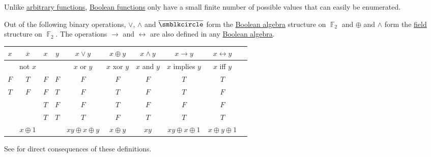 \begin{definition}\label{def:standard_boolean_operators}
  Unlike \hyperref[def:function]{arbitrary functions}, \hyperref[def:boolean_function]{Boolean functions} only have a small finite number of possible values that can easily be enumerated.

  Out of the following binary operations, \( \vee \), \( \wedge \) and \( \overline{\anon} \) form the \hyperref[def:boolean_algebra]{Boolean algebra} structure on \( \BbbF_2 \) and \( \oplus \) and \( \wedge \) form the \hyperref[def:field]{field} structure on \( \BbbF_2 \). The operations \( \rightarrow \) and \( \leftrightarrow \) are also defined in any \hyperref[def:boolean_algebra]{Boolean algebra}.

  \begin{center}
    \begin{tabular}{c | c || c c | c c c c c c}
      \( x \) & \( \overline{x} \) & \( x \) & \( y \) & \( x \vee y \)             & \( x \oplus y \)    & \( x \wedge y \)        & \( x \rightarrow y \)   & \( x \leftrightarrow y \) \\
      \hline
              & not \( x \)        &         &         & \( x \) or \( y \)         & \( x \) xor \( y \) & \( x \) and \( y \)     & \( x \) implies \( y \) & \( x \) iff \( y \)       \\
      \hline
      \( F \) & \( T \)            & \( F \) & \( F \) & \( F \)                    & \( F \)             & \( F \)                 & \( T \)                 & \( T \)                   \\
      \( T \) & \( F \)            & \( F \) & \( T \) & \( F \)                    & \( T \)             & \( F \)                 & \( T \)                 & \( F \)                   \\
              &                    & \( T \) & \( F \) & \( F \)                    & \( T \)             & \( F \)                 & \( F \)                 & \( F \)                   \\
              &                    & \( T \) & \( T \) & \( T \)                    & \( F \)             & \( T \)                 & \( T \)                 & \( T \)                   \\
      \hline
              & \( x \oplus 1 \)   &         &         & \( xy \oplus x \oplus y \) & \( x \oplus y \)    & \( xy \)            & \( xy \oplus x \oplus 1 \) & \( x \oplus y \oplus 1 \)
    \end{tabular}
  \end{center}

  See  for direct consequences of these definitions.
\end{definition}

